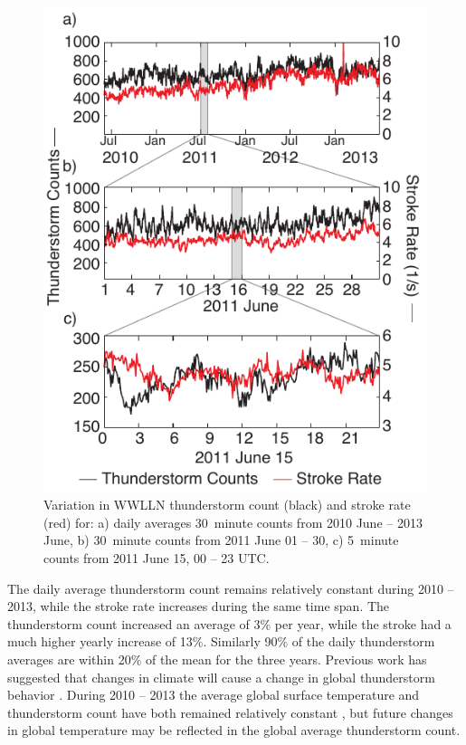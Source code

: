 \begin{figure}[ht!]
    \centering
    \includegraphics[scale=1]{GEC/Figures/timescale.pdf} 
    \caption{Variation in WWLLN thunderstorm count (black) and stroke rate (red) for:
    		a) daily averages 30~minute counts from 2010 June -- 2013 June,
		b) 30~minute counts from 2011 June 01 -- 30,
		c) 5~minute counts from 2011 June 15, 00 -- 23 UTC.}
    \label{gec:fig:timescale}
 \end{figure}

The daily average thunderstorm count remains relatively constant during 2010 -- 2013, while the stroke rate increases during the same time span.
The thunderstorm count increased an average of 3\% per year, while the stroke had a much higher yearly increase of 13\%.
Similarly 90\% of the daily thunderstorm averages are within 20\% of the mean for the three years.
Previous work has suggested that changes in climate will cause a change in global thunderstorm behavior \citep{Williams2005a, Price2009a}.
During 2010 -- 2013 the average global surface temperature and thunderstorm count have both remained relatively constant \citep{Hansen2013a}, but future changes in global temperature may be reflected in the global average thunderstorm count.

